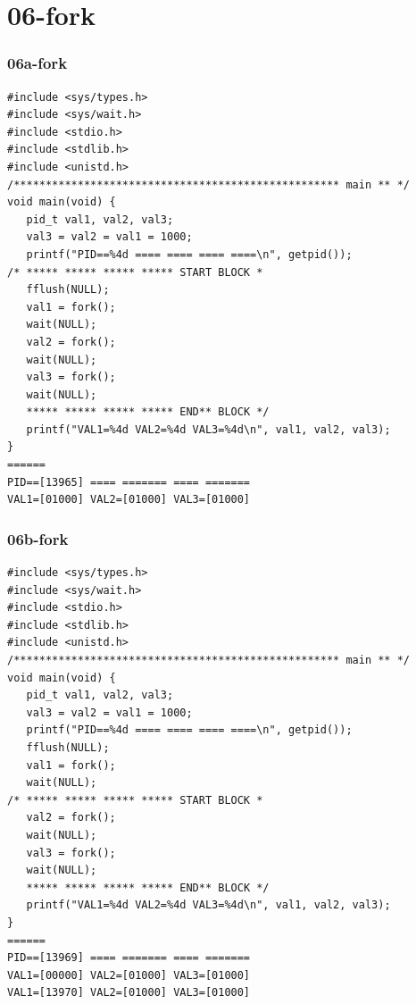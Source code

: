 \documentclass[aspectratio=169, xcolor=table, notheorems, hyperref={pdfpagelabels=false}]{beamer}
\begin{document}
\section{06-fork}
\begin{frame}[fragile]
\frametitle{06a-fork}
\begin{lstlisting}[basicstyle=\ttfamily\tiny]
#include <sys/types.h>
#include <sys/wait.h>
#include <stdio.h>
#include <stdlib.h>
#include <unistd.h>
/*************************************************** main ** */
void main(void) {
   pid_t val1, val2, val3;
   val3 = val2 = val1 = 1000;
   printf("PID==%4d ==== ==== ==== ====\n", getpid());
/* ***** ***** ***** ***** START BLOCK *
   fflush(NULL);
   val1 = fork();
   wait(NULL);
   val2 = fork();
   wait(NULL);
   val3 = fork();
   wait(NULL);
   ***** ***** ***** ***** END** BLOCK */
   printf("VAL1=%4d VAL2=%4d VAL3=%4d\n", val1, val2, val3);
}
======
PID==[13965] ==== ======= ==== =======
VAL1=[01000] VAL2=[01000] VAL3=[01000]
\end{lstlisting}
\end{frame}

\begin{frame}[fragile]
\frametitle{06b-fork}
\begin{lstlisting}[basicstyle=\ttfamily\tiny]
#include <sys/types.h>
#include <sys/wait.h>
#include <stdio.h>
#include <stdlib.h>
#include <unistd.h>
/*************************************************** main ** */
void main(void) {
   pid_t val1, val2, val3;
   val3 = val2 = val1 = 1000;
   printf("PID==%4d ==== ==== ==== ====\n", getpid());
   fflush(NULL);
   val1 = fork();
   wait(NULL);
/* ***** ***** ***** ***** START BLOCK *
   val2 = fork();
   wait(NULL);
   val3 = fork();
   wait(NULL);
   ***** ***** ***** ***** END** BLOCK */
   printf("VAL1=%4d VAL2=%4d VAL3=%4d\n", val1, val2, val3);
}
======
PID==[13969] ==== ======= ==== =======
VAL1=[00000] VAL2=[01000] VAL3=[01000]
VAL1=[13970] VAL2=[01000] VAL3=[01000]

\end{lstlisting}
\end{frame}
\end{document}
